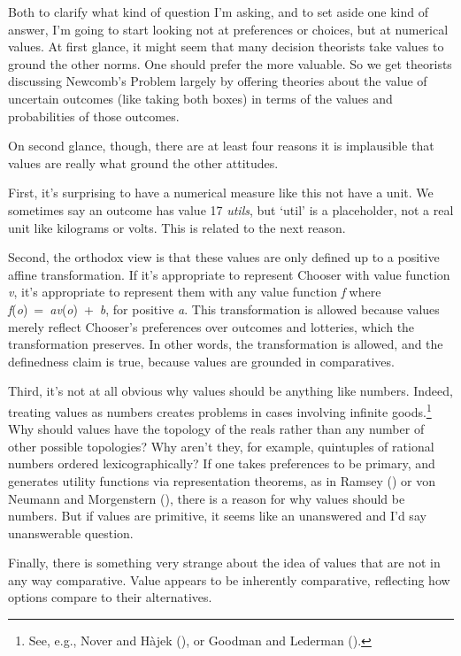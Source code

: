 \documentclass[
  11pt,
  letterpaper,
  DIV=11,
  numbers=noendperiod,
  twoside]{scrartcl}
\begin{document}
Both to clarify what kind of question I'm asking, and to set aside one
kind of answer, I'm going to start looking not at preferences or
choices, but at numerical values. At first glance, it might seem that
many decision theorists take values to ground the other norms. One
should prefer the more valuable. So we get theorists discussing
Newcomb's Problem largely by offering theories about the value of
uncertain outcomes (like taking both boxes) in terms of the values and
probabilities of those outcomes.

On second glance, though, there are at least four reasons it is
implausible that values are really what ground the other attitudes.

First, it's surprising to have a numerical measure like this not have a
unit. We sometimes say an outcome has value 17 \emph{utils}, but `util'
is a placeholder, not a real unit like kilograms or volts. This is
related to the next reason.

Second, the orthodox view is that these values are only defined up to a
positive affine transformation. If it's appropriate to represent Chooser
with value function \emph{v}, it's appropriate to represent them with
any value function \emph{f} where
\emph{f}(\emph{o})~=~\emph{av}(\emph{o})~+~\emph{b}, for positive
\emph{a}. This transformation is allowed because values merely reflect
Chooser's preferences over outcomes and lotteries, which the
transformation preserves. In other words, the transformation is allowed,
and the definedness claim is true, because values are grounded in
comparatives.

Third, it's not at all obvious why values should be anything like
numbers. Indeed, treating values as numbers creates problems in cases
involving infinite goods.\footnote{See, e.g., Nover and Hàjek
  (), or Goodman and Lederman
  ().} Why should values have
the topology of the reals rather than any number of other possible
topologies? Why aren't they, for example, quintuples of rational numbers
ordered lexicographically? If one takes preferences to be primary, and
generates utility functions via representation theorems, as in Ramsey
() or von Neumann and Morgenstern
(), there is a reason for why values
should be numbers. But if values are primitive, it seems like an
unanswered and I'd say unanswerable question.

Finally, there is something very strange about the idea of values that
are not in any way comparative. Value appears to be inherently
comparative, reflecting how options compare to their alternatives.
\end{document}
